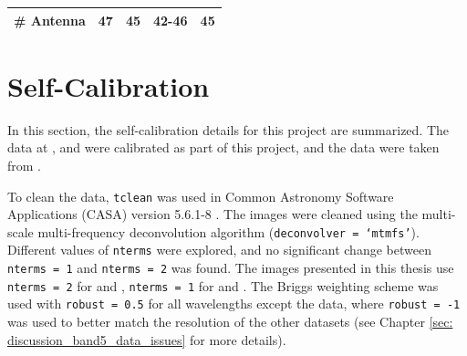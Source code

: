 \begin{table}[h!]
\begin{tabular}{lllll}
\# Antenna
& 47 %
& 45 %
& 42-46 %
& 45 %
\\








\bottomrule
\end{tabular}
\label{tab: alma_observations}
\end{table}












\section{Self-Calibration}


In this section, the self-calibration details for this project are summarized. The data at \bfourNS, \bfive and \bseven were calibrated as part of this project, and the \bsix data were taken from \cite{sadavoy_dust_2019}.


To clean the data,  \texttt{tclean} was used in Common Astronomy Software Applications (CASA) version 5.6.1-8 \citep{CASA}. The images were cleaned using the multi-scale multi-frequency deconvolution algorithm (\texttt{deconvolver = `mtmfs'}). Different values of \texttt{nterms} were explored, and no significant change between \texttt{nterms = 1} and \texttt{nterms = 2} was found. The images presented in this thesis use \texttt{nterms = 2} for \bfour and \bsevenNS, \texttt{nterms = 1} for \bfive and \bsixNS. The Briggs weighting scheme was used with \texttt{robust = 0.5} for all wavelengths except the \bfive data, where \texttt{robust = -1} was used to better match the resolution of the other datasets (see Chapter \ref{sec: discussion_band5_data_issues} for more details). 



